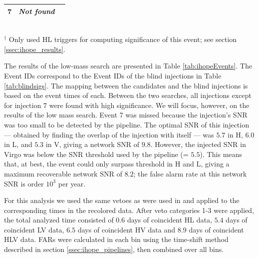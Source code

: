 \begin{table}
\begin{tabular}{@{}ccccccccc}
     \hline
    7 & \multicolumn{7}{c}{\it{Not found}}  \\ 
     \hline
\end{tabular}
\\
$^\dagger$ Only used HL triggers for computing significance of
this event; see section \ref{ssec:ihope_results}.

\end{table}

The results of the low-mass \ihope{} search are presented in
Table \ref{tab:ihopeEvents}. The Event IDs correspond to the Event IDs of the
blind injections in Table \ref{tab:blindsigs}. The mapping between the \ihope{}
candidates and the blind injections is based on the event times of each. 
Between the two \ihope{} searches, all injections except for injection 7 were 
found with high significance. We will focus, however, on the results of the 
low mass search. Event 7 was missed because the injection's SNR was too small to
be detected by the pipeline. The optimal SNR of this injection --- obtained
by finding the overlap of the injection with itself --- was $5.7$ in H, $6.0$ in 
L,
and $5.3$ in V, giving a network SNR of $9.8$. However, the injected SNR in 
Virgo was
below the SNR threshold used by the \ihope{} pipeline (= $5.5$). This
means that, at best, the event could only surpass threshold in H and L, giving
a maximum recoverable network SNR of $8.2$; the false alarm rate at this
network SNR is order $10^3$ per year.

For this analysis we used the same vetoes as were used in
\cite{Colaboration:2011np} and \cite{Aasi:2012rja} applied to
the corresponding times in the recolored data. After veto categories
1-3 were applied, the total analyzed time consisted of $0.6$ days of
coincident HL data, $5.4$ days of coincident LV data, $6.5$ days of
coincident HV data and $8.9$ days of coincident HLV data.  FARs were
calculated in each bin using the time-shift method described in
section \ref{ssec:ihope_pipelines}, then combined over all bins.

